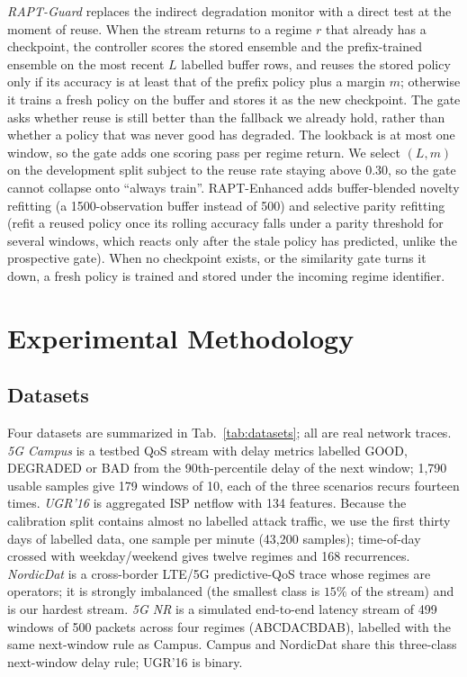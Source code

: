 \documentclass[conference]{IEEEtran}
\begin{document}
\emph{RAPT-Guard} replaces the indirect degradation monitor with a direct test at the
moment of reuse. When the stream returns to a regime $r$ that already has a checkpoint,
the controller scores the stored ensemble and the prefix-trained ensemble on the most
recent $L$ labelled buffer rows, and reuses the stored policy only if its accuracy is at
least that of the prefix policy plus a margin $m$; otherwise it trains a fresh policy on
the buffer and stores it as the new checkpoint. The gate asks whether reuse is still
better than the fallback we already hold, rather than whether a policy that was never good
has degraded. The lookback is at most one window, so the gate adds one scoring pass per
regime return. We select $(L,m)$ on the development split subject to the reuse rate
staying above $0.30$, so the gate cannot collapse onto ``always train''. RAPT-Enhanced
adds buffer-blended novelty refitting (a 1500-observation buffer instead of 500) and
selective parity refitting (refit a reused policy once its rolling accuracy falls under a
parity threshold for several windows, which reacts only after the stale policy has
predicted, unlike the prospective gate). When no checkpoint exists, or the similarity
gate turns it down, a fresh policy is trained and stored under the incoming regime
identifier.


\section{Experimental Methodology}\label{sec:protocol}
\subsection{Datasets}
Four datasets are summarized in Tab.~\ref{tab:datasets}; all are real network traces.
\emph{5G Campus} is a testbed QoS stream with delay metrics labelled GOOD, DEGRADED or BAD
from the 90th-percentile delay of the next window; 1{,}790 usable samples give 179
windows of 10, each of the three scenarios recurs fourteen times. \emph{UGR'16} is
aggregated ISP netflow with 134 features. Because the calibration split contains almost
no labelled attack traffic, we use the first thirty days of labelled data, one sample per
minute (43{,}200 samples); time-of-day crossed with weekday/weekend gives twelve regimes
and 168 recurrences. \emph{NordicDat} is a cross-border LTE/5G predictive-QoS trace
\cite{nordicdat} whose regimes are operators; it is strongly imbalanced (the smallest
class is $15\%$ of the stream) and is our hardest stream. \emph{5G NR} is a simulated
end-to-end latency stream \cite{nrlatency} of 499 windows of 500 packets across four
regimes (ABCDACBDAB), labelled with the same next-window rule as Campus. Campus and
NordicDat share this three-class next-window delay rule; UGR'16 is binary.
\end{document}
